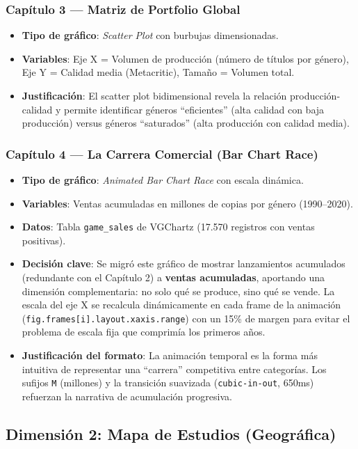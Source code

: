 \documentclass[11pt,a4paper]{article}
\begin{document}
\subsubsection{Capítulo 3 — Matriz de Portfolio Global}
\begin{itemize}
  \item \textbf{Tipo de gráfico}: \textit{Scatter Plot} con burbujas dimensionadas.
  \item \textbf{Variables}: Eje X = Volumen de producción (número de títulos por género), Eje Y = Calidad media (Metacritic), Tamaño = Volumen total.
  \item \textbf{Justificación}: El scatter plot bidimensional revela la relación producción-calidad y permite identificar géneros ``eficientes'' (alta calidad con baja producción) versus géneros ``saturados'' (alta producción con calidad media).
\end{itemize}

\subsubsection{Capítulo 4 — La Carrera Comercial (Bar Chart Race)}
\begin{itemize}
  \item \textbf{Tipo de gráfico}: \textit{Animated Bar Chart Race} con escala dinámica.
  \item \textbf{Variables}: Ventas acumuladas en millones de copias por género (1990--2020).
  \item \textbf{Datos}: Tabla \texttt{game\_sales} de VGChartz (17.570 registros con ventas positivas).
  \item \textbf{Decisión clave}: Se migró este gráfico de mostrar lanzamientos acumulados (redundante con el Capítulo 2) a \textbf{ventas acumuladas}, aportando una dimensión complementaria: no solo qué se produce, sino qué se vende. La escala del eje X se recalcula dinámicamente en cada frame de la animación (\texttt{fig.frames[i].layout.xaxis.range}) con un 15\% de margen para evitar el problema de escala fija que comprimía los primeros años.
  \item \textbf{Justificación del formato}: La animación temporal es la forma más intuitiva de representar una ``carrera'' competitiva entre categorías. Los sufijos \texttt{M} (millones) y la transición suavizada (\texttt{cubic-in-out}, 650ms) refuerzan la narrativa de acumulación progresiva.
\end{itemize}

\subsection{Dimensión 2: Mapa de Estudios (Geográfica)}
\end{document}
